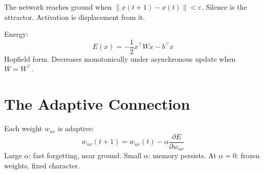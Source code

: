 \documentclass[12pt]{article}
\begin{document}
The network reaches ground when $\|x(t+1) - x(t)\| < \varepsilon$.
Silence is the attractor. Activation is displacement from it.

Energy:
\[
E(x) = -\frac{1}{2} x^\top W x - b^\top x
\]
Hopfield form. Decreases monotonically under asynchronous update
when $W = W^\top$.

\section*{The Adaptive Connection}

Each weight $w_{uv}$ is adaptive:
\[
w_{uv}(t+1) = w_{uv}(t) - \alpha \frac{\partial E}{\partial w_{uv}}
\]
Large $\alpha$: fast forgetting, near ground. Small $\alpha$: memory persists.
At $\alpha = 0$: frozen weights, fixed character.
\end{document}
